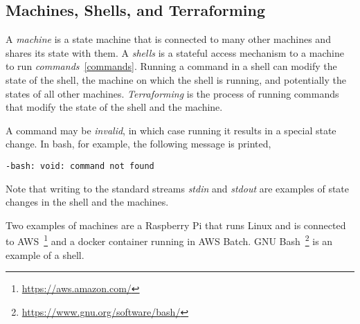 \subsection{Machines, Shells, and Terraforming}
\label{machine}

A \emph{machine} is a state machine that is connected to many other machines and shares its state with them. A \emph{shells} is a stateful access mechanism to a machine to run \emph{commands}~\ref{commands}. Running a command in a shell can modify the state of the shell, the machine on which the shell is running, and potentially the states of all other machines. \emph{Terraforming} is the process of running commands that modify the state of the shell and the machine. 

A command may be \emph{invalid}, in which case running it results in a special state change. In bash, for example, the following message is printed,

\begin{verbatim}
-bash: void: command not found
\end{verbatim}

Note that writing to the standard streams \emph{stdin} and \emph{stdout} are examples of state changes in the shell and the machines. 

Two examples of machines are a Raspberry Pi that runs Linux and is connected to AWS~\footnote{\url{https://aws.amazon.com/}} and a docker container running in AWS Batch. GNU Bash~\footnote{\url{https://www.gnu.org/software/bash/}} is an example of a shell.
